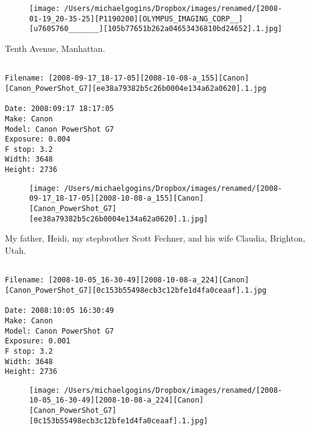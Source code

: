 \begin{figure}
\texttt{[image: /Users/michaelgogins/Dropbox/images/renamed/[2008-01-19\_20-35-25][P1190200][OLYMPUS\_IMAGING\_CORP\_\_][u760S760\_\_\_\_\_\_\_][105b77651b262a04653436810bd24652].1.jpg]}
\end{figure}
    
\clearpage
\onecolumn
\noindent Tenth Avenue, Manhattan.
\noindent
\begin{lstlisting}

Filename: [2008-09-17_18-17-05][2008-10-08-a_155][Canon][Canon_PowerShot_G7][ee38a79382b5c26b0004e134a62a0620].1.jpg

Date: 2008:09:17 18:17:05
Make: Canon
Model: Canon PowerShot G7
Exposure: 0.004
F stop: 3.2
Width: 3648
Height: 2736
\end{lstlisting}
\clearpage

\begin{figure}
\texttt{[image: /Users/michaelgogins/Dropbox/images/renamed/[2008-09-17\_18-17-05][2008-10-08-a\_155][Canon][Canon\_PowerShot\_G7][ee38a79382b5c26b0004e134a62a0620].1.jpg]}
\end{figure}
    
\clearpage
\onecolumn
\noindent My father, Heidi, my stepbrother Scott Fechner, and his wife Claudia, Brighton, Utah.
\noindent
\begin{lstlisting}

Filename: [2008-10-05_16-30-49][2008-10-08-a_224][Canon][Canon_PowerShot_G7][0c153b55498ecb3c12bfe1d4fa0ceaaf].1.jpg

Date: 2008:10:05 16:30:49
Make: Canon
Model: Canon PowerShot G7
Exposure: 0.001
F stop: 3.2
Width: 3648
Height: 2736
\end{lstlisting}
\clearpage

\begin{figure}
\texttt{[image: /Users/michaelgogins/Dropbox/images/renamed/[2008-10-05\_16-30-49][2008-10-08-a\_224][Canon][Canon\_PowerShot\_G7][0c153b55498ecb3c12bfe1d4fa0ceaaf].1.jpg]}
\end{figure}
    
